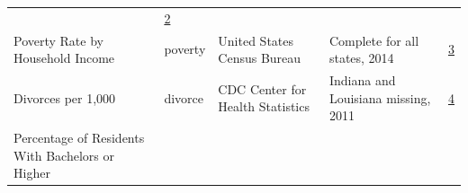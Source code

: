 \documentclass[floatsintext,mask,man]{apa6}
\theoremstyle{definition}
\theoremstyle{definition}
\theoremstyle{definition}
\theoremstyle{remark}
\begin{document}
\begin{longtable}[]{@{}lllll@{}}
\begin{minipage}[t]{0.22\columnwidth}
\end{minipage} & \begin{minipage}[t]{0.04\columnwidth}\raggedright\strut
\href{http://injuryprevention.bmj.com/content/injuryprev/early/2015/06/09/injuryprev-2015-041586.full.pdf?keytype=ref\&ijkey=doj6vx0laFZMsQ2}{2}\strut
\end{minipage}\tabularnewline
\begin{minipage}[t]{0.29\columnwidth}\raggedright\strut
Poverty Rate by Household Income\strut
\end{minipage} & \begin{minipage}[t]{0.09\columnwidth}\raggedright\strut
poverty\strut
\end{minipage} & \begin{minipage}[t]{0.22\columnwidth}\raggedright\strut
United States Census Bureau\strut
\end{minipage} & \begin{minipage}[t]{0.22\columnwidth}\raggedright\strut
Complete for all states, 2014\strut
\end{minipage} & \begin{minipage}[t]{0.04\columnwidth}\raggedright\strut
\href{https://www.census.gov/content/dam/Census/library/publications/2015/demo/p60-252.pdf}{3}\strut
\end{minipage}\tabularnewline
\begin{minipage}[t]{0.29\columnwidth}\raggedright\strut
Divorces per 1,000\strut
\end{minipage} & \begin{minipage}[t]{0.09\columnwidth}\raggedright\strut
divorce\strut
\end{minipage} & \begin{minipage}[t]{0.22\columnwidth}\raggedright\strut
CDC Center for Health Statistics\strut
\end{minipage} & \begin{minipage}[t]{0.22\columnwidth}\raggedright\strut
Indiana and Louisiana missing, 2011\strut
\end{minipage} & \begin{minipage}[t]{0.04\columnwidth}\raggedright\strut
\href{https://www.cdc.gov/nchs/data/dvs/divorce_rates_90_95_99-11.pdf}{4}\strut
\end{minipage}\tabularnewline
\begin{minipage}[t]{0.29\columnwidth}\raggedright\strut
Percentage of Residents With Bachelors or Higher\strut
\end{minipage} & \begin{minipage}[t]{0.09\columnwidth}\raggedright\strut

\end{minipage}
\end{longtable}
\end{document}
